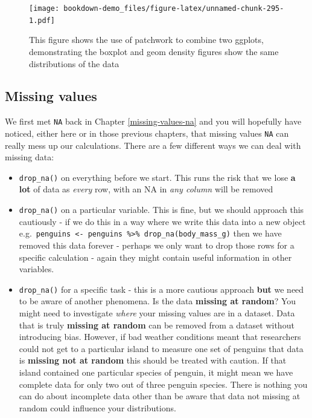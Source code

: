 \documentclass[
]{book}
\begin{document}
\begin{figure}
\centering
\texttt{[image: bookdown-demo\_files/figure-latex/unnamed-chunk-295-1.pdf]}
\caption{\label{fig:unnamed-chunk-295}This figure shows the use of patchwork to combine two ggplots, demonstrating the boxplot and geom density figures show the same distributions of the data}
\end{figure}

\hypertarget{missing-values}{%
\subsection{Missing values}\label{missing-values}}

We first met \texttt{NA} back in Chapter \ref{missing-values-na} and you will hopefully have noticed, either here or in those previous chapters, that missing values \texttt{NA} can really mess up our calculations. There are a few different ways we can deal with missing data:

\begin{itemize}
\item
  \texttt{drop\_na()} on everything before we start. This runs the risk that we lose \textbf{a lot} of data as \emph{every} row, with an NA in \emph{any column} will be removed
\item
  \texttt{drop\_na()} on a particular variable. This is fine, but we should approach this cautiously - if we do this in a way where we write this data into a new object e.g.~\texttt{penguins\ \textless{}-\ penguins\ \%\textgreater{}\%\ drop\_na(body\_mass\_g)} then we have removed this data forever - perhaps we only want to drop those rows for a specific calculation - again they might contain useful information in other variables.
\item
  \texttt{drop\_na()} for a specific task - this is a more cautious approach \textbf{but} we need to be aware of another phenomena. Is the data \textbf{missing at random}? You might need to investigate \emph{where} your missing values are in a dataset. Data that is truly \textbf{missing at random} can be removed from a dataset without introducing bias. However, if bad weather conditions meant that researchers could not get to a particular island to measure one set of penguins that data is \textbf{missing not at random} this should be treated with caution. If that island contained one particular species of penguin, it might mean we have complete data for only two out of three penguin species. There is nothing you can do about incomplete data other than be aware that data not missing at random could influence your distributions.
\end{itemize}
\end{document}
